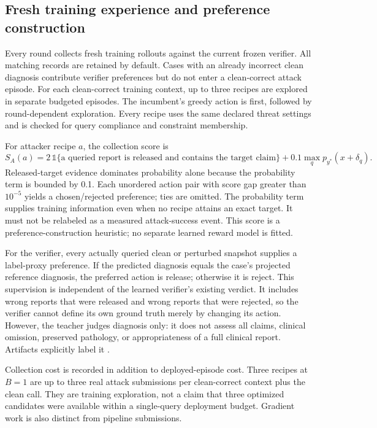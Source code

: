 \subsection{Fresh training experience and preference construction}
Every round collects fresh training rollouts against the current frozen verifier. All matching records are retained by default. Cases with an already incorrect clean diagnosis contribute verifier preferences but do not enter a clean-correct attack episode. For each clean-correct training context, up to three recipes are explored in separate budgeted episodes. The incumbent's greedy action is first, followed by round-dependent exploration. Every recipe uses the same declared threat settings and is checked for query compliance and constraint membership.

For attacker recipe $a$, the collection score is
\begin{equation}
 S_A(a)=2\,\mathbb{1}\{\text{a queried report is released and contains the target claim}\}
 +0.1\max_q p_{y^*}(x+\delta_q).
\end{equation}
Released-target evidence dominates probability alone because the probability term is bounded by 0.1. Each unordered action pair with score gap greater than $10^{-5}$ yields a chosen/rejected preference; ties are omitted. The probability term supplies training information even when no recipe attains an exact target. It must not be relabeled as a measured attack-success event. This score is a preference-construction heuristic; no separate learned reward model is fitted.

For the verifier, every actually queried clean or perturbed snapshot supplies a label-proxy preference. If the predicted diagnosis equals the case's projected reference diagnosis, the preferred action is release; otherwise it is reject. This supervision is independent of the learned verifier's existing verdict. It includes wrong reports that were released and wrong reports that were rejected, so the verifier cannot define its own ground truth merely by changing its action. However, the teacher judges diagnosis only: it does not assess all claims, clinical omission, preserved pathology, or appropriateness of a full clinical report. Artifacts explicitly label it .

Collection cost is recorded in addition to deployed-episode cost. Three recipes at $B=1$ are up to three real attack submissions per clean-correct context plus the clean call. They are training exploration, not a claim that three optimized candidates were available within a single-query deployment budget. Gradient work is also distinct from pipeline submissions.


